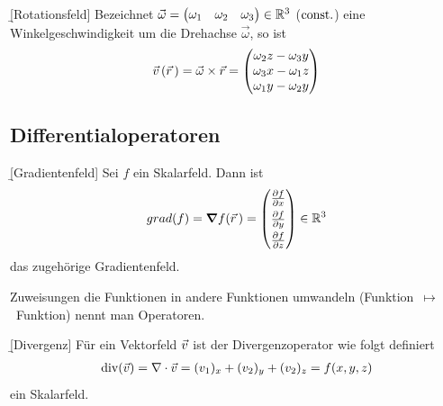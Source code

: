 \documentclass[12pt]{article}
\begin{document}
\begin{defn}{\b{[Rotationsfeld]}} Bezeichnet $\vec{\omega}=\begin{pmatrix}
            \omega_1 & \omega_2 & \omega_3
        \end{pmatrix}\in\mathbb{R}^3$ ($\mathrm{const}.$) eine Winkelgeschwindigkeit um die Drehachse $\vec{\omega}$,
    so ist
    \begin{align}
        \vec{v}\,(\vec{r}\,)=\vec{\omega}\times\vec{r}=\begin{pmatrix}
                                                \omega_2 z -\omega_3 y \\
                                                \omega_3 x-\omega_1 z  \\
                                                \omega_1 y-\omega_2 y
                                            \end{pmatrix}
    \end{align}
\end{defn}

\subsection{Differentialoperatoren}

\begin{defn}{\b{[Gradientenfeld]}}
    Sei $f$ ein Skalarfeld. Dann ist
    \begin{align}
        grad(f)=\grad{f(\vr\,)}=\begin{pmatrix}
                                    \pdv{f}{x} \\[4pt]
                                    \pdv{f}{y} \\[4pt]
                                    \pdv{f}{z}
                                \end{pmatrix}\in\R^3
    \end{align} das zugehörige Gradientenfeld.
\end{defn}

\begin{rmk}{}{} Zuweisungen die Funktionen in andere Funktionen umwandeln (Funktion~$\mapsto$~Funktion) nennt man Operatoren.
\end{rmk}\vspace*{1em}

\begin{defn}{\b{[Divergenz]}} Für ein Vektorfeld $\vec{v}$ ist der Divergenzoperator wie folgt definiert
    \begin{align}
        \mathrm{div}(\vec{v})=\nabla\cdot{\vec{v}}=(v_1)_x+(v_2)_y+(v_2)_z=f(x,y,z)
    \end{align} ein Skalarfeld.
\end{defn}
\end{document}
